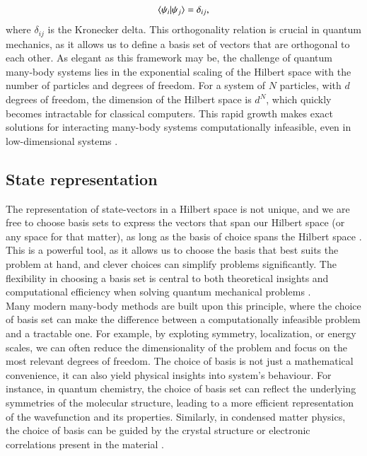 \documentclass{subfiles}
\begin{document}
\begin{align*}
    \braket{\psi_i|\psi_j} = \delta_{ij},
\end{align*}
where $\delta_{ij}$ is the Kronecker delta. This orthogonality relation is crucial in quantum mechanics, as it allows us to define a basis set of vectors that are orthogonal to each other. As elegant as this framework may be, the challenge of quantum many-body systems lies in the exponential scaling of the Hilbert space with the number of particles and degrees of freedom. For a system of $N$ particles, with $d$ degrees of freedom, the dimension of the Hilbert space is $d^N$, which quickly becomes intractable for classical computers. This rapid growth makes exact solutions for interacting many-body systems computationally infeasible, even in low-dimensional systems \cite{helgaker2013molecular, szabo1996modern}.

\subsection{State representation}\label{sec:state_representation}
The representation of state-vectors in a Hilbert space is not unique, and we are free to choose basis sets to express the vectors that span our Hilbert space (or any space for that matter), as long as the basis of choice spans the Hilbert space \cite{griffiths2018introduction, berera2021quantum}. This is a powerful tool, as it allows us to choose the basis that best suits the problem at hand, and clever choices can simplify problems significantly. The flexibility in choosing a basis set is central to both theoretical insights and computational efficiency when solving quantum mechanical problems \cite{helgaker2013molecular, szabo1996modern}. \\

Many modern many-body methods are built upon this principle, where the choice of basis set can make the difference between a computationally infeasible problem and a tractable one. For example, by exploting symmetry, localization, or energy scales, we can often reduce the dimensionality of the problem and focus on the most relevant degrees of freedom. The choice of basis is not just a mathematical convenience, it can also yield physical insights into system's behaviour. For instance, in quantum chemistry, the choice of basis set can reflect the underlying symmetries of the molecular structure, leading to a more efficient representation of the wavefunction and its properties. Similarly, in condensed matter physics, the choice of basis can be guided by the crystal structure or electronic correlations present in the material \cite{baroni2001phonons, kittel2018introduction}. \\
\end{document}
